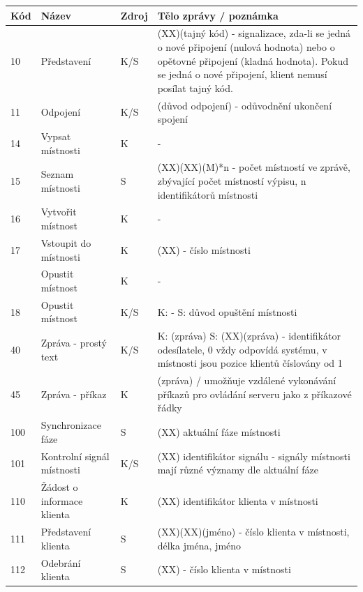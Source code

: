 \documentclass[12pt,a4paper]{article}
\begin{document}
\begin{table}[h]
\center
\begin{tabular}{|l|p{3cm}|l|p{10cm}|}
\hline
\textbf{Kód} & \textbf{Název} & \textbf{Zdroj} & \textbf{Tělo zprávy / poznámka}\\ \hline
10 & Představení & K/S & (XX)(tajný kód) - signalizace, zda-li se jedná o nové připojení (nulová hodnota) nebo o opětovné připojení (kladná hodnota). Pokud se jedná o nové připojení, klient nemusí posílat tajný kód.  \\ \hline
11 & Odpojení & K/S & (důvod odpojení) - odůvodnění ukončení spojení \\ \hline
14 & Vypsat místnosti & K & - \\ \hline
15 & Seznam místnosti & S & (XX)(XX)(M)*n - počet místností ve zprávě, zbývající počet místností výpisu, n identifikátorů místnosti \\ \hline
16 & Vytvořit místnost & K & - \\ \hline
17 & Vstoupit do místnosti & K & (XX) - číslo místnosti \\ \hline
 & Opustit místnost & K & - \\ \hline
18 & Opustit místnost & K/S & K: - \newline S: důvod opuštění místnosti \\ \hline

40 & Zpráva - prostý text & K/S & K: (zpráva) \newline S: (XX)(zpráva) - identifikátor odesílatele, 0 vždy odpovídá systému, v místnosti jsou pozice klientů číslovány od 1 \\ \hline
45 & Zpráva - příkaz & K & (zpráva) / umožňuje vzdálené vykonávání příkazů pro ovládání serveru jako z příkazové řádky \\ \hline
100 & Synchronizace fáze & S & (XX) aktuální fáze místnosti \\ \hline
101 & Kontrolní signál místnosti & K/S & (XX) identifikátor signálu - signály místnosti mají různé významy dle aktuální fáze\\ \hline
110 & Žádost o informace klienta & K & (XX) identifikátor klienta v místnosti \\ \hline
111 & Představení klienta & S & (XX)(XX)(jméno) - číslo klienta v místnosti, délka jména, jméno \\ \hline
112 & Odebrání klienta & S & (XX) - číslo klienta v místnosti \\ \hline

\end{tabular}
\end{table}
\end{document}
